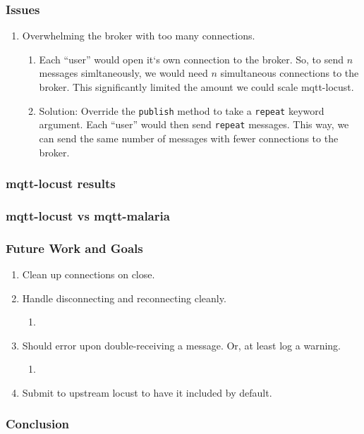 \documentclass{beamer}
\begin{document}
\begin{frame}
    \frametitle{Issues}
    \begin{enumerate}
        \item
            Overwhelming the broker with too many connections.
            \begin{enumerate}
                \item Each ``user'' would open it`s own connection to the
                broker. So, to send $n$ messages simltaneously, we would need
                $n$ simultaneous connections to the broker. This significantly
                limited the amount we could scale mqtt-locust.
                \item Solution: Override the \texttt{publish} method to take a
                \texttt{repeat} keyword argument. Each ``user'' would then send
                \texttt{repeat} messages. This way, we can send the same number
                of messages with fewer connections to the broker.
            \end{enumerate}
    \end{enumerate}
\end{frame}

\begin{frame}
    \frametitle{mqtt-locust results}
\end{frame}

\begin{frame}
    \frametitle{mqtt-locust vs mqtt-malaria}
\end{frame}

\begin{frame}
    \frametitle{Future Work and Goals}
    \begin{enumerate}
        \item
            Clean up connections on close.
        \item
            Handle disconnecting and reconnecting cleanly.
            \begin{enumerate}
                \item
            \end{enumerate}
        \item
            Should error upon double-receiving a message. Or, at least log a
            warning.
            \begin{enumerate}
                \item
            \end{enumerate}
        \item
            Submit to upstream locust to have it included by default.
    \end{enumerate}
\end{frame}

\begin{frame}
    \frametitle{Conclusion}
\end{frame}
\end{document}
